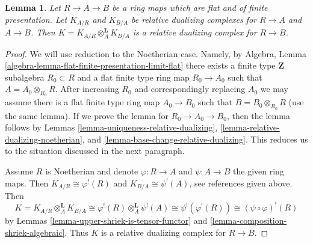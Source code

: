 \documentclass{stacks-project}
\theoremstyle{plain}
\newtheorem{lemma}[subsection]{Lemma}
\theoremstyle{definition}
\theoremstyle{remark}
\numberwithin{equation}{subsection}
\begin{document}
\begin{lemma}
\label{lemma-relative-dualizing-composition}
Let $R \to A \to B$ be a ring maps which are flat and of finite presentation.
Let $K_{A/R}$ and $K_{B/A}$ be relative dualizing complexes for $R \to A$
and $A \to B$. Then $K = K_{A/R} \otimes_A^\mathbf{L} K_{B/A}$
is a relative dualizing complex for $R \to B$.
\end{lemma}

\begin{proof}
We will use reduction to the Noetherian case.
Namely, by Algebra, Lemma
\ref{algebra-lemma-flat-finite-presentation-limit-flat}
there exists a finite type $\mathbf{Z}$ subalgebra $R_0 \subset R$
and a flat finite type ring map $R_0 \to A_0$ such that
$A = A_0 \otimes_{R_0} R$. After increasing $R_0$ and correspondingly
replacing $A_0$ we may assume there is a flat
finite type ring map $A_0 \to B_0$ such that $B = B_0 \otimes_{R_0} R$
(use the same lemma). If we prove the lemma for $R_0 \to A_0 \to B_0$,
then the lemma follows by Lemmas
\ref{lemma-uniqueness-relative-dualizing},
\ref{lemma-relative-dualizing-noetherian}, and
\ref{lemma-base-change-relative-dualizing}.
This reduces us to the situation discussed in the next paragraph.

\medskip\noindent
Assume $R$ is Noetherian and denote $\varphi : R \to A$ and
$\psi : A \to B$ the given ring maps. Then $K_{A/R} \cong \varphi^!(R)$ and
$K_{B/A} \cong \psi^!(A)$, see references given above.
Then
$$
K = K_{A/R} \otimes_A^\mathbf{L} K_{B/A} \cong
\varphi^!(R) \otimes_A^\mathbf{L} \psi^!(A) \cong
\psi^!(\varphi^!(R)) \cong (\psi \circ \varphi)^!(R)
$$
by Lemmas \ref{lemma-upper-shriek-is-tensor-functor} and
\ref{lemma-composition-shriek-algebraic}. Thus $K$ is a relative
dualizing complex for $R \to B$.
\end{proof}









\end{document}
